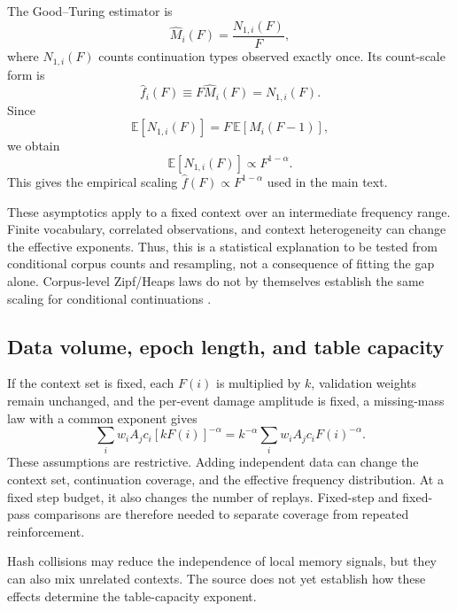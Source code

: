 The Good--Turing estimator is
\begin{equation}
\widehat M_i(F)=\frac{N_{1,i}(F)}{F},
\end{equation}
where $N_{1,i}(F)$ counts continuation types observed exactly once. Its count-scale form is
\begin{equation}
\widehat f_i(F)
\equiv F\widehat M_i(F)
=N_{1,i}(F).
\end{equation}
Since
\begin{equation}
\mathbb{E}[N_{1,i}(F)]
=F\,\mathbb{E}[M_i(F-1)],
\end{equation}
we obtain
\begin{equation}
\mathbb{E}[N_{1,i}(F)]
\propto F^{1-\alpha}.
\end{equation}
This gives the empirical scaling
$\widehat f(F)\propto F^{1-\alpha}$ used in the main text.

These asymptotics apply to a fixed context over an intermediate frequency range. Finite vocabulary, correlated observations, and context heterogeneity can change the effective exponents. Thus, this is a statistical explanation to be tested from conditional corpus counts and resampling, not a consequence of fitting the gap alone. Corpus-level Zipf/Heaps laws do not by themselves establish the same scaling for conditional continuations \citep{gnedin2007occupancy,gerlach2013vocabulary}.

\subsection{Data volume, epoch length, and table capacity}

If the context set is fixed, each $F(i)$ is multiplied by $k$, validation weights remain unchanged, and the per-event damage amplitude is fixed, a missing-mass law with a common exponent gives
\begin{equation}
 \sum_i w_i A_j c_i[kF(i)]^{-\alpha}
 =k^{-\alpha}\sum_i w_i A_j c_iF(i)^{-\alpha}.
\end{equation}
These assumptions are restrictive. Adding independent data can change the context set, continuation coverage, and the effective frequency distribution. At a fixed step budget, it also changes the number of replays. Fixed-step and fixed-pass comparisons are therefore needed to separate coverage from repeated reinforcement.

Hash collisions may reduce the independence of local memory signals, but they can also mix unrelated contexts. The source does not yet establish how these effects determine the table-capacity exponent.

